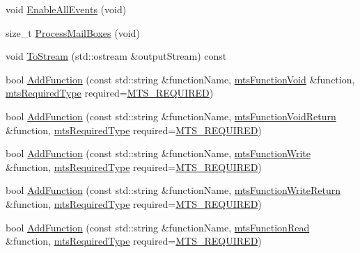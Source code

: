 \begin{DoxyCompactItemize}
void \hyperlink{classmts_interface_required_a0db28333d5d0b79355ef53144a09b593}{Enable\-All\-Events} (void)
\item 
size\-\_\-t \hyperlink{classmts_interface_required_a3e769b22bfd482d10017ce470263f2a1}{Process\-Mail\-Boxes} (void)
\item 
void \hyperlink{classmts_interface_required_ad53b7950640adb692b779c1bb36aba8b}{To\-Stream} (std\-::ostream \&output\-Stream) const 
\item 
bool \hyperlink{classmts_interface_required_ad2ab83c04348062513a7e3033df82d61}{Add\-Function} (const std\-::string \&function\-Name, \hyperlink{classmts_function_void}{mts\-Function\-Void} \&function, \hyperlink{mts_forward_declarations_8h_a9ef1ce54724afde7802db326ff8606f3}{mts\-Required\-Type} required=\hyperlink{mts_forward_declarations_8h_a9ef1ce54724afde7802db326ff8606f3ae01fd85391b60e546bbb1be9716c4ec9}{M\-T\-S\-\_\-\-R\-E\-Q\-U\-I\-R\-E\-D})
\item 
bool \hyperlink{classmts_interface_required_acbe83b9581fdb7566a353881b88ab1ef}{Add\-Function} (const std\-::string \&function\-Name, \hyperlink{classmts_function_void_return}{mts\-Function\-Void\-Return} \&function, \hyperlink{mts_forward_declarations_8h_a9ef1ce54724afde7802db326ff8606f3}{mts\-Required\-Type} required=\hyperlink{mts_forward_declarations_8h_a9ef1ce54724afde7802db326ff8606f3ae01fd85391b60e546bbb1be9716c4ec9}{M\-T\-S\-\_\-\-R\-E\-Q\-U\-I\-R\-E\-D})
\item 
bool \hyperlink{classmts_interface_required_a87661cef474a4ae5b4d27510b363f87a}{Add\-Function} (const std\-::string \&function\-Name, \hyperlink{classmts_function_write}{mts\-Function\-Write} \&function, \hyperlink{mts_forward_declarations_8h_a9ef1ce54724afde7802db326ff8606f3}{mts\-Required\-Type} required=\hyperlink{mts_forward_declarations_8h_a9ef1ce54724afde7802db326ff8606f3ae01fd85391b60e546bbb1be9716c4ec9}{M\-T\-S\-\_\-\-R\-E\-Q\-U\-I\-R\-E\-D})
\item 
bool \hyperlink{classmts_interface_required_ae673de7b335bc64c9396fb35b99d1d04}{Add\-Function} (const std\-::string \&function\-Name, \hyperlink{classmts_function_write_return}{mts\-Function\-Write\-Return} \&function, \hyperlink{mts_forward_declarations_8h_a9ef1ce54724afde7802db326ff8606f3}{mts\-Required\-Type} required=\hyperlink{mts_forward_declarations_8h_a9ef1ce54724afde7802db326ff8606f3ae01fd85391b60e546bbb1be9716c4ec9}{M\-T\-S\-\_\-\-R\-E\-Q\-U\-I\-R\-E\-D})
\item 
bool \hyperlink{classmts_interface_required_a13b7efe37262dc270e9937e5da3d7ec0}{Add\-Function} (const std\-::string \&function\-Name, \hyperlink{classmts_function_read}{mts\-Function\-Read} \&function, \hyperlink{mts_forward_declarations_8h_a9ef1ce54724afde7802db326ff8606f3}{mts\-Required\-Type} required=\hyperlink{mts_forward_declarations_8h_a9ef1ce54724afde7802db326ff8606f3ae01fd85391b60e546bbb1be9716c4ec9}{M\-T\-S\-\_\-\-R\-E\-Q\-U\-I\-R\-E\-D})

\end{DoxyCompactItemize}

